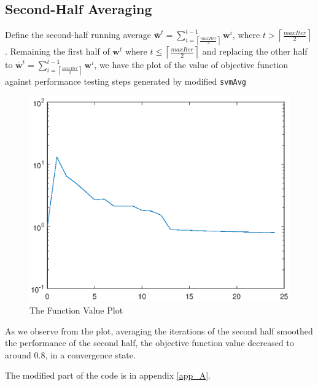 \documentclass[10pt]{article}
\begin{document}
\subsection{Second-Half Averaging}
Define the second-half running average $\bar{\mathbf{w}}^t = \sum\limits_{i=\left\lceil\frac{maxIter}{2}\right\rceil}^{t-1}\mathbf{w}^i$, where $t > \left\lceil\frac{maxIter}{2}\right\rceil$. Remaining the first half of $\mathbf{w}^t$ where $t \leq \left\lceil\frac{maxIter}{2}\right\rceil$ and replacing the other half to $\bar{\mathbf{w}}^t = \sum\limits_{i=\left\lceil\frac{maxIter}{2}\right\rceil}^{t-1}\mathbf{w}^i$, we have the plot of the value of objective function against performance testing steps generated by modified \texttt{svmAvg}
\begin{figure}[H]
\centering
\includegraphics[scale=.65]{bonus2.eps}
\caption{The Function Value Plot}
\label{bonus2}
\end{figure}
As we observe from the plot, averaging the iterations of the second half smoothed the performance of the second half, the objective function value decreased to around $0.8$, in a convergence state.\par
The modified part of the code is in appendix \ref{app_A}.
\end{document}
